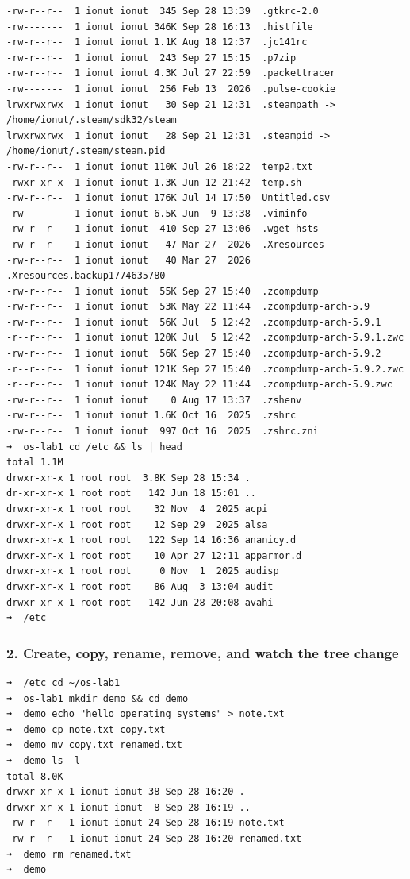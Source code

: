 \documentclass{labreport}
\begin{document}
\begin{lstlisting}[style=bash]
-rw-r--r--  1 ionut ionut  345 Sep 28 13:39  .gtkrc-2.0
-rw-------  1 ionut ionut 346K Sep 28 16:13  .histfile
-rw-r--r--  1 ionut ionut 1.1K Aug 18 12:37  .jc141rc
-rw-r--r--  1 ionut ionut  243 Sep 27 15:15  .p7zip
-rw-r--r--  1 ionut ionut 4.3K Jul 27 22:59  .packettracer
-rw-------  1 ionut ionut  256 Feb 13  2026  .pulse-cookie
lrwxrwxrwx  1 ionut ionut   30 Sep 21 12:31  .steampath -> /home/ionut/.steam/sdk32/steam
lrwxrwxrwx  1 ionut ionut   28 Sep 21 12:31  .steampid -> /home/ionut/.steam/steam.pid
-rw-r--r--  1 ionut ionut 110K Jul 26 18:22  temp2.txt
-rwxr-xr-x  1 ionut ionut 1.3K Jun 12 21:42  temp.sh
-rw-r--r--  1 ionut ionut 176K Jul 14 17:50  Untitled.csv
-rw-------  1 ionut ionut 6.5K Jun  9 13:38  .viminfo
-rw-r--r--  1 ionut ionut  410 Sep 27 13:06  .wget-hsts
-rw-r--r--  1 ionut ionut   47 Mar 27  2026  .Xresources
-rw-r--r--  1 ionut ionut   40 Mar 27  2026  .Xresources.backup1774635780
-rw-r--r--  1 ionut ionut  55K Sep 27 15:40  .zcompdump
-rw-r--r--  1 ionut ionut  53K May 22 11:44  .zcompdump-arch-5.9
-rw-r--r--  1 ionut ionut  56K Jul  5 12:42  .zcompdump-arch-5.9.1
-r--r--r--  1 ionut ionut 120K Jul  5 12:42  .zcompdump-arch-5.9.1.zwc
-rw-r--r--  1 ionut ionut  56K Sep 27 15:40  .zcompdump-arch-5.9.2
-r--r--r--  1 ionut ionut 121K Sep 27 15:40  .zcompdump-arch-5.9.2.zwc
-r--r--r--  1 ionut ionut 124K May 22 11:44  .zcompdump-arch-5.9.zwc
-rw-r--r--  1 ionut ionut    0 Aug 17 13:37  .zshenv
-rw-r--r--  1 ionut ionut 1.6K Oct 16  2025  .zshrc
-rw-r--r--  1 ionut ionut  997 Oct 16  2025  .zshrc.zni
➜  os-lab1 cd /etc && ls | head
total 1.1M
drwxr-xr-x 1 root root  3.8K Sep 28 15:34 .
dr-xr-xr-x 1 root root   142 Jun 18 15:01 ..
drwxr-xr-x 1 root root    32 Nov  4  2025 acpi
drwxr-xr-x 1 root root    12 Sep 29  2025 alsa
drwxr-xr-x 1 root root   122 Sep 14 16:36 ananicy.d
drwxr-xr-x 1 root root    10 Apr 27 12:11 apparmor.d
drwxr-xr-x 1 root root     0 Nov  1  2025 audisp
drwxr-xr-x 1 root root    86 Aug  3 13:04 audit
drwxr-xr-x 1 root root   142 Jun 28 20:08 avahi
➜  /etc
\end{lstlisting}

\subsubsection{2. Create, copy, rename, remove, and watch the tree change}
\begin{lstlisting}[style=bash]
➜  /etc cd ~/os-lab1
➜  os-lab1 mkdir demo && cd demo
➜  demo echo "hello operating systems" > note.txt
➜  demo cp note.txt copy.txt
➜  demo mv copy.txt renamed.txt
➜  demo ls -l
total 8.0K
drwxr-xr-x 1 ionut ionut 38 Sep 28 16:20 .
drwxr-xr-x 1 ionut ionut  8 Sep 28 16:19 ..
-rw-r--r-- 1 ionut ionut 24 Sep 28 16:19 note.txt
-rw-r--r-- 1 ionut ionut 24 Sep 28 16:20 renamed.txt
➜  demo rm renamed.txt
➜  demo
\end{lstlisting}
\end{document}
